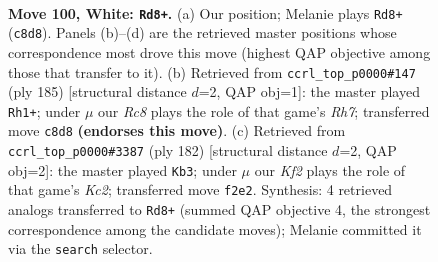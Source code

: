 \documentclass[11pt]{article}
\begin{document}
\begin{figure}[p]\centering
\begin{subfigure}{0.46\textwidth}\centering
\resizebox{\linewidth}{!}{%
\newchessgame
\chessboard[
  setfen={2R5/8/3k4/8/7r/r7/5K2/8 w - - 10 100},
  showmover=false,
  pgfstyle=straightmove, color=movearrow, markmove={c8-d8}
]}
\caption{}
\end{subfigure}\hfill
\begin{subfigure}{0.46\textwidth}\centering
\resizebox{\linewidth}{!}{%
\newchessgame
\chessboard[
  setfen={1k6/8/8/8/8/2R5/7r/3K4 b - - 17 93},
  showmover=false,
  pgfstyle=straightmove, color=movearrow, markmove={h2-h1}
]}
\caption{}
\end{subfigure}
\\[4pt]
\begin{subfigure}{0.46\textwidth}\centering
\resizebox{\linewidth}{!}{%
\newchessgame
\chessboard[
  setfen={1R6/r7/3r4/8/7R/8/2K3k1/8 w - - 18 92},
  showmover=false,
  pgfstyle=straightmove, color=movearrow, markmove={c2-b3}
]}
\caption{}
\end{subfigure}\hfill

\caption{\textbf{Move 100, White: \texttt{Rd8+}.} (a) Our position; Melanie plays \texttt{Rd8+} (\texttt{c8d8}). Panels (b)--(d) are the retrieved master positions whose correspondence most drove this move (highest QAP objective among those that transfer to it). (b) Retrieved from \texttt{ccrl\_top\_p0000\#147} (ply 185) [structural distance $d$=2, QAP obj=1]: the master played \texttt{Rh1+}; under $\mu$ our \emph{Rc8} plays the role of that game's \emph{Rh7}; transferred move \texttt{c8d8} \textbf{(endorses this move)}. (c) Retrieved from \texttt{ccrl\_top\_p0000\#3387} (ply 182) [structural distance $d$=2, QAP obj=2]: the master played \texttt{Kb3}; under $\mu$ our \emph{Kf2} plays the role of that game's \emph{Kc2}; transferred move \texttt{f2e2}. Synthesis: 4 retrieved analogs transferred to \texttt{Rd8+} (summed QAP objective 4, the strongest correspondence among the candidate moves); Melanie committed it via the \texttt{search} selector.}
\label{fig:thought-m198}
\end{figure}

\clearpage
\end{document}
